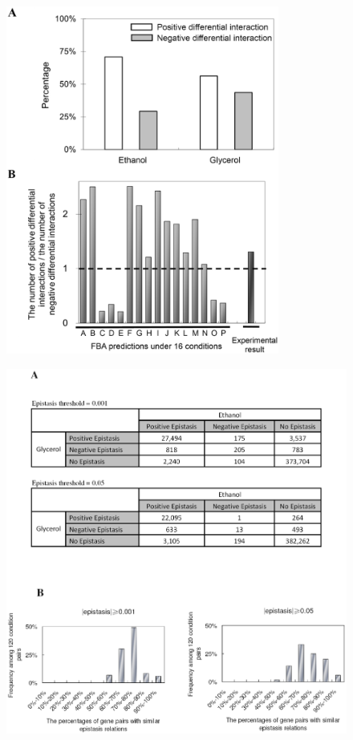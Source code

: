 \documentclass[letterpaper]{article}
\begin{document}
\begin{figure}[!htb]
\centering
\includegraphics[width=0.8\textwidth]{envFigure_S2}
\caption{\eeFBAfigSTwoCap}
\label{fig:eefS2}
\end{figure}

\begin{figure}[!htb]
\centering
\includegraphics[width=\textwidth]{envFigure_S3}
\caption{\eeFBAfigSThreeCap}
\label{fig:eefS3}
\end{figure}
\end{document}
